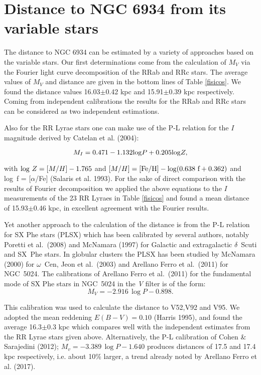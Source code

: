 \documentclass[journal]{rmaa}
\newcommand{\1}{\'{\i}}
\begin{document}
\section{Distance to NGC 6934 from its variable stars}
\label{sec:DISTANCE}

The distance to NGC 6934 can be estimated by a variety of approaches based on the variable stars.
Our first determinations come from the calculation of $M_V$ via the Fourier light curve decomposition
of the RRab and RRc stars. The average values of $M_V$ and distance are given in the bottom lines of Table
\ref{fisicos}. We found the distance values
16.03$\pm$0.42 kpc and 15.91$\pm$0.39 kpc respectively. Coming from independent
calibrations the results for the RRab and RRc
stars can be considered as two independent estimations.

Also for the RR Lyrae stars one can make use of the P-L relation for the $I$
magnitude derived by Catelan et al. (2004):

 \begin{equation}
M_I = 0.471 - 1.132 {\rm log} P + 0.205 {\rm log} Z,
\label{eqn:PL_RRI}
\end{equation}

\noindent
with ${\rm log}~Z =[M/H] -1.765$ and $[M/H] = \rm{[Fe/H]} - \rm {log} (0.638~f +
0.362)$ and log~f = [$\alpha$/Fe] (Salaris et al. 1993). For the sake of direct
comparison with the results of
Fourier decomposition we applied the above equations to the $I$ measurements of the 23 RR Lyraes in
Table \ref{fisicos} and found  a mean distance of 15.93$\pm$0.46 kpc, in excellent
agreement with the Fourier results.

Yet another approach to the calculation of the distance is from the P-L relation for
SX Phe stars (PLSX) which has been calibrated  by several
authors, notably Poretti et al.\ (2008) and McNamara (1997) for Galactic and
extragalactic $\delta$~Scuti and SX~Phe stars. In globular clusters the PLSX
has been studied by McNamara (2000) for $\omega$~Cen, Jeon et al.\ (2003) and Arellano
Ferro et al.\ (2011) for NGC~5024.
The calibrations of Arellano Ferro et al.\ (2011) for the fundamental mode of SX Phe
stars in NGC~5024 in the \textit{V} filter is of the form:
%
\begin{equation}
\label{PLV}
M_V = -2.916\, \log P - 0.898.
\end{equation}

This  calibration was used to calculate the distance to V52,V92 and V95. We adopted
the mean reddening $E(B-V)=0.10$ (Harris 1995), and found
the average 16.3$\pm$0.3 kpc which compares well with the independent
estimates from the RR Lyrae stars given above.
Alternatively, the P-L calibration of  Cohen \& Sarajedini (2012);
$M_v=-3.389\, \log P -1.640$ produces distances of 17.5 and 17.4 kpc respectively,
i.e. about 10\% larger, a trend already noted by Arellano Ferro et al. (2017).
\end{document}
